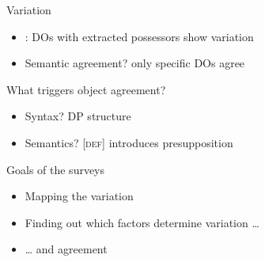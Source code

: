 \documentclass[12pt]{beamer}
\begin{document}
\begin{frame}{Variation}

    \begin{itemize}

        \item \textcite{Szabolcsi1994}: DOs with extracted possessors show
            variation

        \item \alert{Semantic agreement?} only specific DOs agree

    \end{itemize}


\end{frame}

\begin{frame}{What triggers object agreement?}

        \begin{itemize}

            \item Syntax? DP structure\hfill\parencite{Bartos1999}
            \item Semantics? [\textsc{def}] introduces presupposition\hfill\parencite{Coppock2013P}

        \end{itemize}

    \begin{block}{Goals of the surveys}

        \begin{itemize}

            \item Mapping the variation

            \item Finding out which factors determine variation \dots

            \item \dots{} and agreement

        \end{itemize}

    \end{block}

\end{frame}
\end{document}
